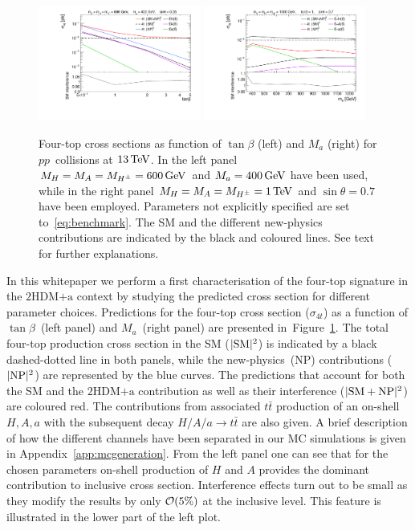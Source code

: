 \documentclass[a4paper, 11pt,notoc]{article}
\newcommand{\mA}{\ensuremath{M_{A}}\xspace}
\newcommand{\ma}{\ensuremath{M_{a}}\xspace}
\newcommand{\mH}{\ensuremath{M_{H}}\xspace}
\newcommand{\mHc}{\ensuremath{M_{H^{\pm}}}\xspace}
\newcommand{\hdma}{\ensuremath{\textrm{2HDM+a}}\xspace}
\begin{document}
\begin{figure}[!t]
\centering
\includegraphics[width=0.475\textwidth]{plot_tb.pdf} \quad 
\includegraphics[width=0.475\textwidth]{plot_ma.pdf}
\vspace{4mm}
\caption{\label{fig:4top} Four-top cross sections as function of $\tan \beta$ (left) and $\ma$ (right) for $pp$~collisions at $13 \, {\rm TeV}$.   In the left panel $\mH =\mA=\mHc = 600 \, {\rm GeV}$ and  $\ma = 400 \, {\rm GeV}$ have been used, while in the right panel $\mH =\mA=\mHc = 1 \, {\rm TeV}$ and  $\sin \theta = 0.7$ have been employed. Parameters not explicitly specified are set to~\eqref{eq:benchmark}.  The SM and the different new-physics contributions are indicated by the black and coloured lines. See text for further explanations.}
\end{figure}

{\color{blue} In this whitepaper we perform a first characterisation of the four-top signature in the \hdma context by studying the predicted cross section for different parameter choices.} Predictions for the four-top cross section ($\sigma_{4t}$) as a function of $\tan \beta$~(left panel) and $\ma$~(right panel) are presented in~Figure~\ref{fig:4top}. The total four-top production cross section in the SM ($|{\rm SM}|^2$) is indicated by a black dashed-dotted line in both panels, while the new-physics~(NP) contributions ($|{\rm NP}|^2$) are represented by the blue curves. The predictions that account for both the SM and the \hdma contribution as well as  their interference ($|{\rm SM} + {\rm NP}|^2$) are coloured red. The contributions from associated $t \bar t$ production of an on-shell $H, A, a$ with the subsequent decay $H/A/a \to t \bar t$ are also given.  A brief description of how the different channels have been separated in our MC simulations  is given in Appendix~\ref{app:mcgeneration}. From the left panel one can see that for the chosen parameters on-shell production of $H$ and $A$ provides the dominant contribution to inclusive cross section. Interference effects turn out to be small as they modify the results  by only ${\cal O} (5\%)$ at the inclusive level. This feature is illustrated in the lower part of the left plot.
\end{document}
